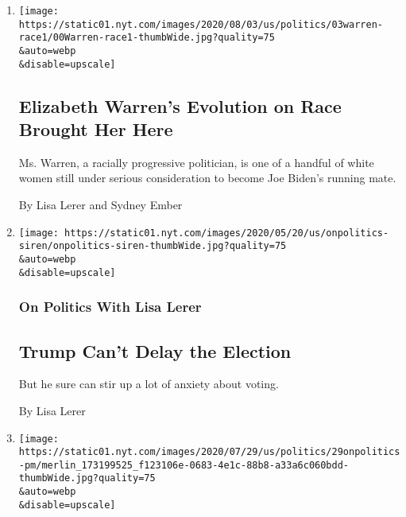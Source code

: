 \begin{enumerate}
\def\labelenumi{\arabic{enumi}.}
\item
  \href{/2020/08/02/us/politics/elizabeth-warren-biden-vice-president.html}{}

  \texttt{[image: https://static01.nyt.com/images/2020/08/03/us/politics/03warren-race1/00Warren-race1-thumbWide.jpg?quality=75\\\&auto=webp\\\&disable=upscale]}

  \hypertarget{elizabeth-warrens-evolution-on-race-brought-her-here}{%
  \subsection{Elizabeth Warren's Evolution on Race Brought Her
  Here}\label{elizabeth-warrens-evolution-on-race-brought-her-here}}

  Ms. Warren, a racially progressive politician, is one of a handful of
  white women still under serious consideration to become Joe Biden's
  running mate.

  By Lisa Lerer and Sydney Ember
\item
  \href{/2020/07/30/us/politics/trump-election-delay-distraction.html}{}

  \texttt{[image: https://static01.nyt.com/images/2020/05/20/us/onpolitics-siren/onpolitics-siren-thumbWide.jpg?quality=75\\\&auto=webp\\\&disable=upscale]}

  \hypertarget{on-politics-with-lisa-lerer}{%
  \subsubsection{On Politics With Lisa
  Lerer}\label{on-politics-with-lisa-lerer}}

  \hypertarget{trump-cant-delay-the-election}{%
  \subsection{Trump Can't Delay the
  Election}\label{trump-cant-delay-the-election}}

  But he sure can stir up a lot of anxiety about voting.

  By Lisa Lerer
\item
  \href{/2020/07/29/us/politics/patty-murray-schools-reopening.html}{}

  \texttt{[image: https://static01.nyt.com/images/2020/07/29/us/politics/29onpolitics-pm/merlin\_173199525\_f123106e-0683-4e1c-88b8-a33a6c060bdd-thumbWide.jpg?quality=75\\\&auto=webp\\\&disable=upscale]}


\end{enumerate}
